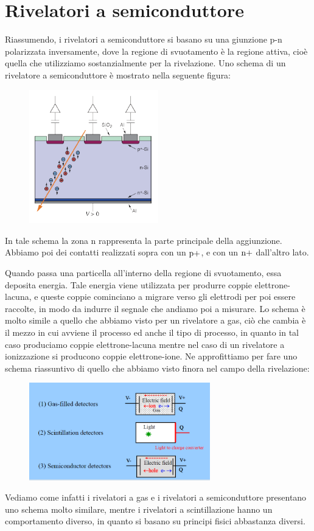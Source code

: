 \section{Rivelatori a semiconduttore}
Riassumendo, i rivelatori a semiconduttore si basano su una giunzione p-n polarizzata inversamente, dove la regione di svuotamento è la regione attiva, cioè quella che utilizziamo sostanzialmente per la rivelazione. Uno schema di un rivelatore a semiconduttore è mostrato nella seguente figura:
\begin{figure}[H]
   \centering
   \includegraphics[width=0.5\textwidth]{immagini/rivelatore_a_semiconduttore.png}
\end{figure}
In tale schema la zona n rappresenta la parte principale della aggiunzione. Abbiamo poi dei contatti realizzati sopra con un $\rm p+$, e con un $\rm n+$ dall'altro lato.

Quando passa una particella all'interno della regione di svuotamento, essa deposita energia. Tale energia viene utilizzata per produrre coppie elettrone-lacuna, e queste coppie cominciano a migrare verso gli elettrodi per poi essere raccolte, in modo da indurre il segnale che andiamo poi a misurare. Lo schema è molto simile a quello che abbiamo visto per un rivelatore a gas, ciò che cambia è il mezzo in cui avviene il processo ed anche il tipo di processo, in quanto in tal caso produciamo coppie elettrone-lacuna mentre nel caso di un rivelatore a ionizzazione si producono coppie elettrone-ione. Ne approfittiamo per fare uno schema riassuntivo di quello che abbiamo visto finora nel campo della rivelazione:
\begin{figure}[H]
   \centering
   \includegraphics[width=0.7\textwidth]{immagini/schema_rivelatori.png}
\end{figure}
Vediamo come infatti i rivelatori a gas e i rivelatori a semiconduttore presentano uno schema molto similare, mentre i rivelatori a scintillazione hanno un comportamento diverso, in quanto si basano su principi fisici abbastanza diversi.


